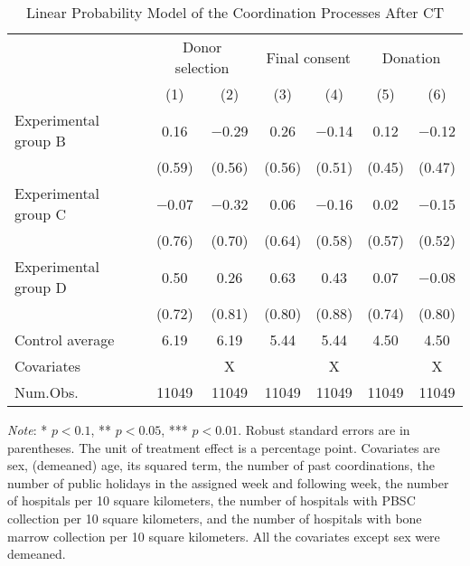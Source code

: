 \documentclass[12pt, a4paper]{article}
\begin{document}
\begin{table}

\caption{\label{tab:lm-coordinate}Linear Probability Model of the Coordination Processes After CT}
\centering
\fontsize{8}{10}\selectfont
\begin{threeparttable}
\begin{tabular}[t]{lcccccc}
\toprule
\multicolumn{1}{c}{ } & \multicolumn{2}{c}{Donor selection} & \multicolumn{2}{c}{Final consent} & \multicolumn{2}{c}{Donation} \\
\cmidrule(l{3pt}r{3pt}){2-3} \cmidrule(l{3pt}r{3pt}){4-5} \cmidrule(l{3pt}r{3pt}){6-7}
  & (1) & (2) & (3) & (4) & (5) & (6)\\
\midrule
Experimental group B & \num{0.16} & \num{-0.29} & \num{0.26} & \num{-0.14} & \num{0.12} & \num{-0.12}\\
 & (\num{0.59}) & (\num{0.56}) & (\num{0.56}) & (\num{0.51}) & (\num{0.45}) & (\num{0.47})\\
Experimental group C & \num{-0.07} & \num{-0.32} & \num{0.06} & \num{-0.16} & \num{0.02} & \num{-0.15}\\
 & (\num{0.76}) & (\num{0.70}) & (\num{0.64}) & (\num{0.58}) & (\num{0.57}) & (\num{0.52})\\
Experimental group D & \num{0.50} & \num{0.26} & \num{0.63} & \num{0.43} & \num{0.07} & \num{-0.08}\\
 & (\num{0.72}) & (\num{0.81}) & (\num{0.80}) & (\num{0.88}) & (\num{0.74}) & (\num{0.80})\\
\midrule
Control average & 6.19 & 6.19 & 5.44 & 5.44 & 4.50 & 4.50\\
Covariates &  & X &  & X &  & X\\
Num.Obs. & \num{11049} & \num{11049} & \num{11049} & \num{11049} & \num{11049} & \num{11049}\\
\bottomrule
\end{tabular}
\begin{tablenotes}
\item \emph{Note}: * $p < 0.1$, ** $p < 0.05$, *** $p < 0.01$. Robust standard errors are in parentheses. The unit of treatment effect is a percentage point. Covariates are sex, (demeaned) age, its squared term, the number of past coordinations, the number of public holidays in the assigned week and following week, the number of hospitals per 10 square kilometers, the number of hospitals with PBSC collection per 10 square kilometers, and the number of hospitals with bone marrow collection per 10 square kilometers. All the covariates except sex were demeaned.
\end{tablenotes}
\end{threeparttable}
\end{table}
\end{document}
